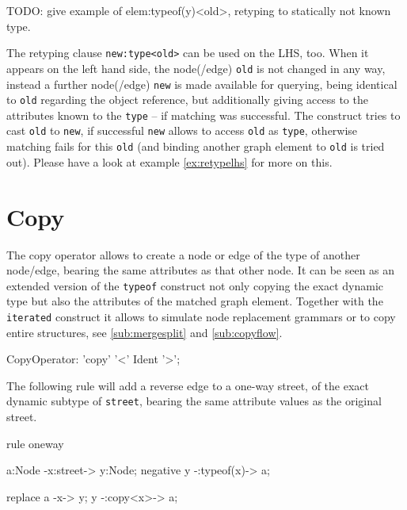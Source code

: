 TODO: give example of elem:typeof(y)<old>, retyping to statically not known type.

The retyping clause \texttt{new:type<old>} can be used on the LHS, too.
When it appears on the left hand side, the node(/edge) \texttt{old} is not changed in any way,
instead a further node(/edge) \texttt{new} is made available for querying,
being identical to \texttt{old} regarding the object reference,
but additionally giving access to the attributes known to the \texttt{type} -- if matching was successful.
The construct tries to cast \texttt{old} to \texttt{new}, 
if successful \texttt{new} allows to access \texttt{old} as \texttt{type},
otherwise matching fails for this \texttt{old} (and binding another graph element to \texttt{old} is tried out).
Please have a look at example \ref{ex:retypelhs} for more on this.


\section{Copy} \label{sec:copy}

The copy operator allows to create a node or edge of the type of another node/edge, bearing the same attributes as that other node. It can be seen as an extended version of the \texttt{typeof} construct not only copying the exact dynamic type but also the attributes of the matched graph element. Together with the \texttt{iterated} construct it allows to simulate node replacement grammars or to copy entire structures, see \ref{sub:mergesplit} and \ref{sub:copyflow}.

\begin{rail}
  CopyOperator: 'copy' '<' Ident '>';
\end{rail}

\begin{example}
The following rule will add a reverse edge to a one-way street, of the exact dynamic subtype of \texttt{street}, bearing the same attribute values as the original street.
\begin{grgen}
rule oneway {
  a:Node -x:street-> y:Node;
  negative {
    y -:typeof(x)-> a;
  }

  replace {
    a -x-> y;
    y -:copy<x>-> a;
  }
}
\end{grgen}
\end{example}



